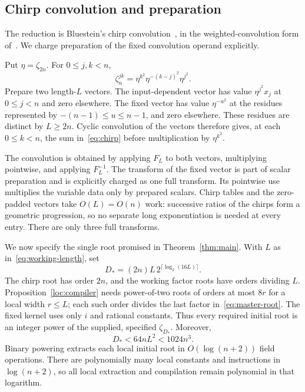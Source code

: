 \subsection{Chirp convolution and preparation}

The reduction is Bluestein's chirp convolution~\cite{bluestein}, in the
weighted-convolution form of~\cite[Section~II]{rabinerSchaferRader1969}.
We charge preparation of the fixed convolution operand explicitly.

Put $\eta=\zeta_{2n}$. For $0\le j,k<n$,
\begin{equation}\label{eq:chirp}
 \zeta_n^{jk}=\eta^{k^2}\eta^{-(k-j)^2}\eta^{j^2}.
\end{equation}
Prepare two length-$L$ vectors. The input-dependent vector has value $\eta^{j^2}x_j$ at $0\le j<n$ and zero elsewhere. The fixed vector has value $\eta^{-u^2}$ at the residues represented by $-(n-1)\le u\le n-1$, and zero elsewhere. These residues are distinct by $L\ge2n$. Cyclic convolution of the vectors therefore gives, at each $0\le k<n$, the sum in~\eqref{eq:chirp} before multiplication by $\eta^{k^2}$.

The convolution is obtained by applying $F_L$ to both vectors, multiplying pointwise, and applying $F_L^{-1}$. The transform of the fixed vector is part of scalar preparation and is explicitly charged as one full transform. Its pointwise use multiplies the variable data only by prepared scalars. Chirp tables and the zero-padded vectors take $O(L)=O(n)$ work: successive ratios of the chirps form a geometric progression, so no separate long exponentiation is needed at every entry. There are only three full transforms.

We now specify the single root promised in Theorem~\ref{thm:main}. With $L$ as in~\eqref{eq:working-length}, set
\begin{equation}\label{eq:master-root}
 D_*=(2n)L\,2^{\lceil\log_2(16L)\rceil}.
\end{equation}
The chirp root has order $2n$, and the working factor roots have orders dividing $L$. Proposition~\ref{loc:compiler} needs power-of-two roots of orders at most $8r$ for a local width $r\le L$; each such order divides the last factor in~\eqref{eq:master-root}. The fixed kernel uses only $i$ and rational constants. Thus every required initial root is an integer power of the supplied, specified $\zeta_{D_*}$. Moreover,
\begin{equation}\label{eq:root-size}
 D_*<64nL^2<1024n^3.
\end{equation}
Binary powering extracts each local initial root in $O(\log(n+2))$ field operations. There are polynomially many local constants and instructions in $\log(n+2)$, so all local extraction and compilation remain polynomial in that logarithm.

